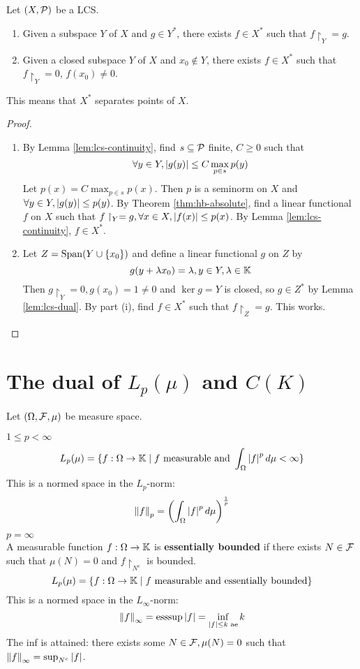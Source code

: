 \documentclass{article}
\begin{document}
\begin{nthm}\label{thm:hb-lcs}
  Let $(X, \mathcal P)$ be a LCS.
  \begin{enumerate}
    \item Given a subspace $Y$ of $X$ and $g \in Y^*$, there exists $f \in X^*$ such that $f\restriction_Y = g$.
    \item Given a closed subspace $Y$ of $X$ and $x_0 \nin Y$, there exists $f \in X^*$ such that $f\restriction_Y = 0$, $f(x_0) \ne 0$.
  \end{enumerate}
\end{nthm}
\begin{rmk}
  This means that $X^*$ separates points of $X$.
\end{rmk}
\begin{proof}~
  \begin{enumerate}
    \item By Lemma \ref{lem:lcs-continuity}, find $s \subseteq \mathcal P$ finite, $C \ge 0$ such that
    $$\forall y \in Y, \left\lvert g(y)\right\rvert \le C\max_{p \in s}p(y)$$
    Let $p(x) = C\max_{p \in s}p(x)$. Then $p$ is a seminorm on $X$ and $\forall y \in Y, \left\lvert g(y)\right\rvert \le p(y)$. By Theorem \ref{thm:hb-absolute}, find a linear functional $f$ on $X$ such that $f\restriction_Y = g, \forall x \in X, \left\lvert f(x)\right\rvert \le p(x)$. By Lemma \ref{lem:lcs-continuity}, $f \in X^*$.
    \item Let $Z = \operatorname{Span}(Y \cup \{x_0\})$ and define a linear functional $g$ on $Z$ by
    $$g(y + \lambda x_0) = \lambda, y \in Y, \lambda \in \mathbb K$$
    Then $g\restriction_Y = 0, g(x_0) = 1 \ne 0$ and $\ker g = Y$ is closed, so $g \in Z^*$ by Lemma \ref{lem:lcs-dual}. By part (i), find $f \in X^*$ such that $f\restriction_Z = g$. This works.
  \end{enumerate}
\end{proof}

\clearpage

\section{The dual of \texorpdfstring{$L_p(\mu)$ and $C(K)$}{Lp(mu) or C(K)}}

Let $(\Omega, \mathcal F, \mu)$ be measure space.

$1 \le p < \infty$
$$L_p(\mu) = \{f : \Omega \rightarrow \mathbb K \mid f \text{ measurable and } \int_\Omega \left\lvert f\right\rvert^p d\mu < \infty\}$$
This is a normed space in the $L_p$-norm:
$$\left\lVert f\right\rVert_p = \left(\int_\Omega \left\lvert f\right\rvert^p d\mu\right)^{\frac 1p}$$

$p = \infty$ \\
A measurable function $f : \Omega \rightarrow \mathbb K$ is {\bf essentially bounded} if there exists $N \in \mathcal F$ such that $\mu(N) = 0$ and $f\restriction_{N^c}$ is bounded.
$$L_p(\mu) = \{f : \Omega \rightarrow \mathbb K \mid f \text{ measurable and essentially bounded}\}$$
This is a normed space in the $L_\infty$-norm:
$$\left\lVert f\right\rVert_\infty = \operatorname{ess sup} \left\lvert f\right\rvert = \inf_{\left\lvert f\right\rvert \le k \text{ ae}} k$$
The inf is attained: there exists some $N \in \mathcal F, \mu(N) = 0$ such that $\left\lVert f\right\rVert_\infty = \sup_{N^c} \left\lvert f\right\rvert$.
\end{document}
